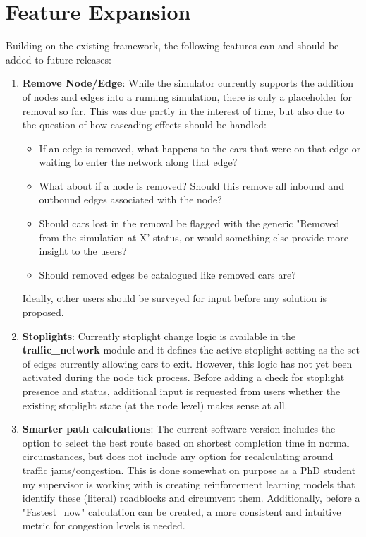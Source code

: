 \section{Feature Expansion}

\par Building on the existing framework, the following features can and should be added to future releases:

\begin{enumerate}
    \item \textbf{Remove Node/Edge}:  While the simulator currently supports the addition of nodes and edges into a running simulation, there is only a placeholder for removal so far.  This was due partly in the interest of time, but also due to the question of how cascading effects should be handled:
        \begin{itemize}
            \item If an edge is removed, what happens to the cars that were on that edge or waiting to enter the network along that edge? 
            \item What about if a node is removed?  Should this remove all inbound and outbound edges associated with the node?
            \item Should cars lost in the removal be flagged with the generic "Removed from the simulation at X' status, or would something else provide more insight to the users?
            \item Should removed edges be catalogued like removed cars are?
        \end{itemize}
    Ideally, other users should be surveyed for input before any solution is proposed.
    \item \textbf{Stoplights}:  Currently stoplight change logic is available in the \textbf{traffic\_network} module and it defines the active stoplight setting as the set of edges currently allowing cars to exit.  However, this logic has not yet been activated during the node tick process.  Before adding a check for stoplight presence and status, additional input is requested from users whether the existing stoplight state (at the node level) makes sense at all.
    \item \textbf{Smarter path calculations}:  The current software version includes the option to select the best route based on shortest completion time in normal circumstances, but does not include any option for recalculating around traffic jams/congestion.  This is done somewhat on purpose as a PhD student my supervisor is working with is creating reinforcement learning models that identify these (literal) roadblocks and circumvent them.  Additionally, before a "Fastest\_now" calculation can be created, a more consistent and intuitive metric for congestion levels is needed.

\end{enumerate}
